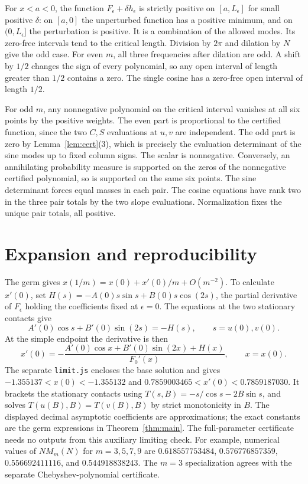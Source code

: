 \documentclass[11pt]{article}
\begin{document}
For \(x<a<0\), the function \(F_\epsilon+\delta h_\epsilon\) is
strictly positive on \([a,L_\epsilon]\) for small positive \(\delta\):
on \([a,0]\) the unperturbed function has a positive minimum, and on
\((0,L_\epsilon]\) the perturbation is positive. It is a combination
of the allowed modes. Its zero-free intervals tend to the critical
length. Division by \(2\pi\) and dilation by \(N\) give the odd case.
For even \(m\), all three frequencies after dilation are odd. A shift
by \(1/2\) changes the sign of every polynomial, so any open interval
of length greater than \(1/2\) contains a zero. The single cosine
has a zero-free open interval of length \(1/2\).

For odd \(m\), any nonnegative polynomial on the critical interval
vanishes at all six points by the positive weights. The even part
is proportional to the certified function, since the two
\(C,S\) evaluations at \(u,v\) are independent. The odd part is zero
by Lemma~\ref{lem:cert}(3), which is precisely the evaluation
determinant of the sine modes up to fixed column signs.
The scalar is nonnegative. Conversely, an annihilating probability
measure is supported on the zeros of the nonnegative certified
polynomial, so is supported on the same six points. The sine
determinant forces equal masses in each pair. The cosine equations
have rank two in the three pair totals by the two slope evaluations.
Normalization fixes the unique pair totals, all positive.

\section{Expansion and reproducibility}
The germ gives \(x(1/m)=x(0)+x'(0)/m+O(m^{-2})\).
To calculate \(x'(0)\), set \(H(s)=-A(0)s\sin s+B(0)s\cos(2s)\),
the partial derivative of \(F_\epsilon\) holding the coefficients
fixed at \(\epsilon=0\). The equations at the two stationary
contacts give
\[
 A'(0)\cos s+B'(0)\sin(2s)=-H(s),\qquad s=u(0),v(0).
\]
At the simple endpoint the derivative is then
\[
 x'(0)=-\frac{A'(0)\cos x+B'(0)\sin(2x)+H(x)}{F_0'(x)},
 \qquad x=x(0).
\]
The separate \texttt{limit.js} encloses the base solution and gives
\(-1.355137<x(0)<-1.355132\) and
\(0.7859003465<x'(0)<0.7859187030\). It brackets the stationary
contacts using \(T(s,B)=-s/\cos s-2B\sin s\), and solves
\(T(u(B),B)=T(v(B),B)\) by strict monotonicity in \(B\).
The displayed decimal asymptotic coefficients are approximations;
the exact constants are the germ expressions in Theorem~\ref{thm:main}.
The full-parameter certificate needs no outputs from this auxiliary
limiting check. For example, numerical values of \(NM_m(N)\) for
\(m=3,5,7,9\) are \(0.618557753484\), \(0.576776857359\),
\(0.556692411116\), and \(0.544918838243\). The \(m=3\) specialization
agrees with the separate Chebyshev-polynomial certificate.
\end{document}
